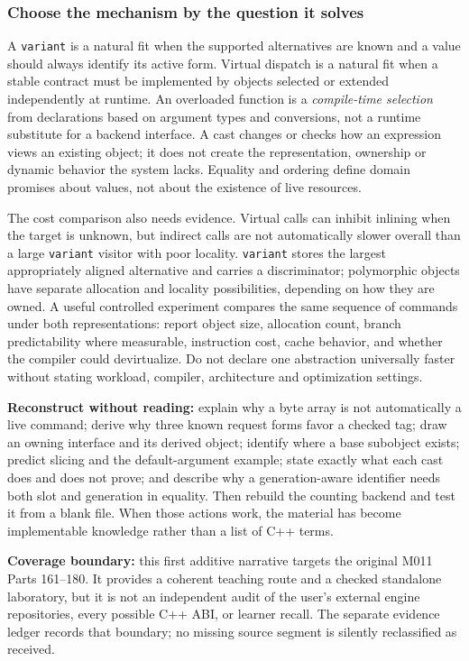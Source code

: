 \subsubsection{Choose the mechanism by the question it solves}\label{choose-the-mechanism-by-the-question-it-solves}

A \texttt{variant} is a natural fit when the supported alternatives are known and a value should always identify its active form. Virtual dispatch is a natural fit when a stable contract must be implemented by objects selected or extended independently at runtime. An overloaded function is a \emph{compile-time selection} from declarations based on argument types and conversions, not a runtime substitute for a backend interface. A cast changes or checks how an expression views an existing object; it does not create the representation, ownership or dynamic behavior the system lacks. Equality and ordering define domain promises about values, not about the existence of live resources.

The cost comparison also needs evidence. Virtual calls can inhibit inlining when the target is unknown, but indirect calls are not automatically slower overall than a large \texttt{variant} visitor with poor locality. \texttt{variant} stores the largest appropriately aligned alternative and carries a discriminator; polymorphic objects have separate allocation and locality possibilities, depending on how they are owned. A useful controlled experiment compares the same sequence of commands under both representations: report object size, allocation count, branch predictability where measurable, instruction cost, cache behavior, and whether the compiler could devirtualize. Do not declare one abstraction universally faster without stating workload, compiler, architecture and optimization settings.

\textbf{Reconstruct without reading:} explain why a byte array is not automatically a live command; derive why three known request forms favor a checked tag; draw an owning interface and its derived object; identify where a base subobject exists; predict slicing and the default-argument example; state exactly what each cast does and does not prove; and describe why a generation-aware identifier needs both slot and generation in equality. Then rebuild the counting backend and test it from a blank file. When those actions work, the material has become implementable knowledge rather than a list of C++ terms.

\textbf{Coverage boundary:} this first additive narrative targets the original M011 Parts 161--180. It provides a coherent teaching route and a checked standalone laboratory, but it is not an independent audit of the user's external engine repositories, every possible C++ ABI, or learner recall. The separate evidence ledger records that boundary; no missing source segment is silently reclassified as received.

